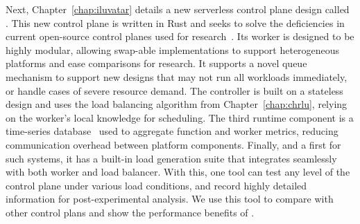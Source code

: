 Next, Chapter~\ref{chap:iluvatar} details a new serverless control plane design called \sysname.
This new control plane is written in Rust and seeks to solve the deficiencies in current open-source control planes used for research~\cite{openwhisk}.
Its worker is designed to be highly modular, allowing swap-able implementations to support heterogeneous platforms and ease comparisons for research.
It supports a novel queue mechanism to support new designs that may not run all workloads immediately, or handle cases of severe resource demand.
The controller is built on a stateless design and uses the load balancing algorithm from Chapter~\ref{chap:chrlu}, relying on the worker's local knowledge for scheduling.
The third runtime component is a time-series database~\cite{influx} used to aggregate function and worker metrics, reducing communication overhead between platform components.
Finally, and a first for such systems, it has a built-in load generation suite that integrates seamlessly with both worker and load balancer.
With this, one tool can test any level of the control plane under various load conditions, and record highly detailed information for post-experimental analysis.
We use this tool to compare with other control plans and show the performance benefits of \sysname.

